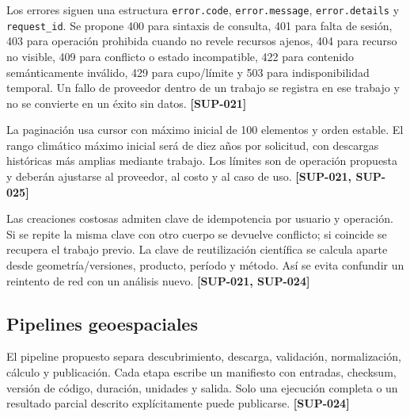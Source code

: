 \documentclass[10pt,a4paper]{article}
\begin{document}
Los errores siguen una estructura \texttt{error.code}, \texttt{error.message}, \texttt{error.details} y \texttt{request\_\allowbreak{}id}. Se propone 400 para sintaxis de consulta, 401 para falta de sesión, 403 para operación prohibida cuando no revele recursos ajenos, 404 para recurso no visible, 409 para conflicto o estado incompatible, 422 para contenido semánticamente inválido, 429 para cupo/\allowbreak{}límite y 503 para indisponibilidad temporal. Un fallo de proveedor dentro de un trabajo se registra en ese trabajo y no se convierte en un éxito sin datos. \textbf{[SUP-021]}


La paginación usa cursor con máximo inicial de 100 elementos y orden estable. El rango climático máximo inicial será de diez años por solicitud, con descargas históricas más amplias mediante trabajo. Los límites son de operación propuesta y deberán ajustarse al proveedor, al costo y al caso de uso. \textbf{[SUP-021, SUP-025]}


Las creaciones costosas admiten clave de idempotencia por usuario y operación. Si se repite la misma clave con otro cuerpo se devuelve conflicto; si coincide se recupera el trabajo previo. La clave de reutilización científica se calcula aparte desde geometría/\allowbreak{}versiones, producto, período y método. Así se evita confundir un reintento de red con un análisis nuevo. \textbf{[SUP-021, SUP-024]}


\subsection{Pipelines geoespaciales}

El pipeline propuesto separa descubrimiento, descarga, validación, normalización, cálculo y publicación. Cada etapa escribe un manifiesto con entradas, checksum, versión de código, duración, unidades y salida. Solo una ejecución completa o un resultado parcial descrito explícitamente puede publicarse. \textbf{[SUP-024]}
\end{document}
